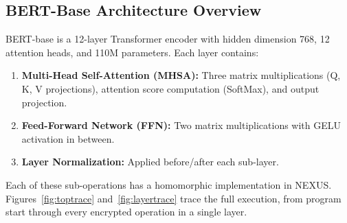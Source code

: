 \documentclass[11pt,letterpaper]{article}
\begin{document}
\subsection{BERT-Base Architecture Overview}

BERT-base is a 12-layer Transformer encoder with hidden dimension 768, 12 attention
heads, and 110M parameters. Each layer contains:

\begin{enumerate}
  \item \textbf{Multi-Head Self-Attention (MHSA):} Three matrix multiplications (Q, K, V
    projections), attention score computation (SoftMax), and output projection.
  \item \textbf{Feed-Forward Network (FFN):} Two matrix multiplications with GELU activation
    in between.
  \item \textbf{Layer Normalization:} Applied before/after each sub-layer.
\end{enumerate}

Each of these sub-operations has a homomorphic implementation in NEXUS.
Figures~\ref{fig:toptrace} and~\ref{fig:layertrace} trace the full execution, from program
start through every encrypted operation in a single layer.
\end{document}

